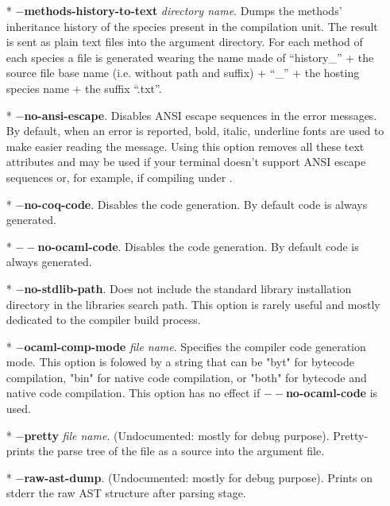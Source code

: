 \begin{itemize}
 \item[*] {\bf $-$methods-history-to-text} {\em directory
   name}. Dumps the methods' inheritance history of the species
   present in the compilation unit. The result is sent as plain text files
   into the argument directory. For each method of each species a file
   is generated wearing the name made of ``history\_'' + the source
   file base name (i.e. without path and suffix) + ``\_'' + the
   hosting species name + the suffix ``.txt''.

  \item[*] {\bf $-$no-ansi-escape}. Disables ANSI escape sequences in
    the error messages. By default, when an error is reported, bold,
    italic, underline fonts are used to make easier reading the
    message. Using this option removes all these text attributes and
    may be used if your terminal doesn't support ANSI escape sequences
    or, for example, if compiling under \emacs.

  \item[*] {\bf $-$no-coq-code}. Disables the {\coq} code
    generation. By default {\coq} code is always generated.

  \item[*] {\bf $--$no-ocaml-code}. Disables the {\ocaml} code
    generation. By default {\ocaml} code is always generated.

   \item[*] {\bf $-$no-stdlib-path}. Does not include the standard
    library installation directory in the libraries search path. This
    option is rarely useful and mostly dedicated to the
    {\focal} compiler build process.

   \item[*] {\bf $-$ocaml-comp-mode} {\em file name}. Specifies the
     {\ocaml} compiler code generation mode. This option is folowed by
     a string that can be "byt" for bytecode compilation, "bin" for
     native code compilation, or "both" for bytecode and native code
     compilation. This option has no effect if {\bf $--$no-ocaml-code}
     is used.

  \item[*] {\bf $-$pretty} {\em file name}. (Undocumented: mostly for
    debug purpose). Pretty-prints the parse tree of the {\focal} file
    as a {\focal} source into the argument file.

  \item[*] {\bf $-$raw-ast-dump}. (Undocumented: mostly for debug
    purpose). Prints on stderr the raw AST structure after parsing
    stage.


\end{itemize}
